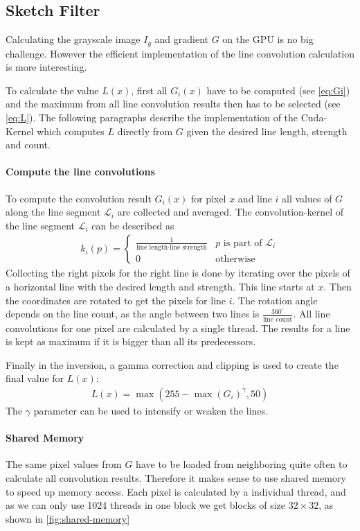 \subsection{Sketch Filter}
Calculating the grayscale image $I_g$ and gradient $G$ on the GPU is no big
challenge. However the efficient implementation of the line convolution
calculation is more interesting.

To calculate the value $L(x)$, first all $G_i(x)$ have to
be computed (see \autoref{eq:Gi}) and the maximum from all line convolution
results then has to be selected (see \autoref{eq:L}). The following paragraphs describe the
implementation of the Cuda-Kernel which computes $L$ directly from $G$ given
the desired line length, strength and count.

\paragraph{Compute the line convolutions} 
To compute the convolution result $G_i(x)$ for pixel $x$ and line $i$ all values of $G$
along the line segment $\mathscr{L}_i$ are collected and averaged. The
convolution-kernel of the line segment $\mathscr{L}_i$ can be described as 
\begin{align*}
  k_i(p) = \begin{cases}
    \frac{1}{\text{line length} \cdot \text{line strength}} & p \text{ is part
    of } \mathscr{L}_i\\
    0 & \text{otherwise}
  \end{cases}
\end{align*}
Collecting the right pixels for the right line is done by iterating over the
pixels of a horizontal line with the desired length and strength. This line
starts at $x$. Then the coordinates are rotated to get the pixels for line $i$.
The rotation angle depends on the line count, as the angle between two lines is
$\frac{360^{\circ}}{\text{line count}}$.  All line convolutions for one pixel
are calculated by a single thread. The results for a line is kept as maximum if
it is bigger than all its predecessors.

Finally in the inversion, a gamma correction and clipping is used to create the
final value for $L(x)$:
\begin{align*}
  L(x) = \max(255 - \max(G_i)^{\gamma}, 50)
\end{align*}
The $\gamma$ parameter can be used to intensify or weaken the lines.

\paragraph{Shared Memory}
The same pixel values from $G$ have to be loaded from neighboring quite often to
calculate all convolution results.  Therefore it makes sense to use shared memory
to speed up memory access.  Each pixel is calculated by a individual thread,
and as we can only use 1024 threads in one block we get blocks of size
$32\times32$, as shown in \autoref{fig:shared-memory}

